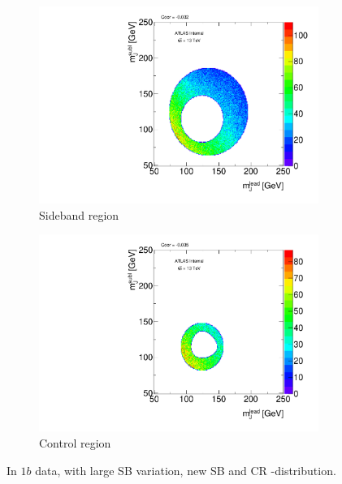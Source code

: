 \begin{figure}[htbp!]
\centering
\captionsetup{justification=centering}
    \begin{subfigure}[b]{0.39\textwidth}
        \includegraphics[width=\textwidth,angle=-90]{figures/boosted/Syst_CRSB/SB_Large_Sideband_OneTag_mH0H1.pdf}
        \caption{Sideband region}
        \label{CRSB:SB_Large_SB}
    \end{subfigure}
    \quad
    \begin{subfigure}[b]{0.39\textwidth}
        \includegraphics[width=\textwidth,angle=-90]{figures/boosted/Syst_CRSB/SB_Large_Control_OneTag_mH0H1.pdf}
        \caption{Control region}
        \label{CRSB:SB_Large_CR}
    \end{subfigure}
\caption{In $1b$ data, with large SB variation, new SB and CR \mleadJ-\msublJ distribution.}
\label{CRSB:SB_Large}
\end{figure}


